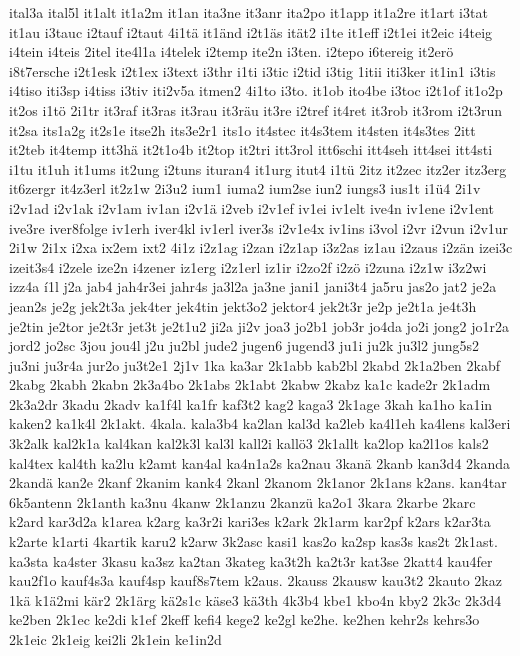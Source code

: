 {ital3a
ital5l
it1alt
it1a2m
it1an
ita3ne
it3anr
ita2po
it1app
it1a2re
it1art
i3tat
it1au
i3tauc
i2tauf
i2taut
4i1tä
it1änd
i2t1äs
ität2
i1te
it1eff
i2t1ei
it2eic
i4teig
i4tein
i4teis
2itel
ite4l1a
i4telek
i2temp
ite2n
i3ten.
i2tepo
i6tereig
it2erö
i8t7ersche
i2t1esk
i2t1ex
i3text
i3thr
i1ti
i3tic
i2tid
i3tig
1itii
iti3ker
it1in1
i3tis
i4tiso
iti3sp
i4tiss
i3tiv
iti2v5a
itmen2
4i1to
i3to.
it1ob
ito4be
i3toc
i2t1of
it1o2p
it2os
i1tö
2i1tr
it3raf
it3ras
it3rau
it3räu
it3re
i2tref
it4ret
it3rob
it3rom
i2t3run
it2sa
its1a2g
it2s1e
itse2h
its3e2r1
its1o
it4stec
it4s3tem
it4sten
it4s3tes
2itt
it2teb
it4temp
itt3hä
it2t1o4b
it2top
it2tri
itt3rol
itt6schi
itt4seh
itt4sei
itt4sti
i1tu
it1uh
it1ums
it2ung
i2tuns
ituran4
it1urg
itut4
i1tü
2itz
it2zec
itz2er
itz3erg
it6zergr
it4z3erl
it2z1w
2i3u2
ium1
iuma2
ium2se
iun2
iungs3
ius1t
i1ü4
2i1v
i2v1ad
i2v1ak
i2v1am
iv1an
i2v1ä
i2veb
i2v1ef
iv1ei
iv1elt
ive4n
iv1ene
i2v1ent
ive3re
iver8folge
iv1erh
iver4kl
iv1erl
iver3s
i2v1e4x
iv1ins
i3vol
i2vr
i2vun
i2v1ur
2i1w
2i1x
i2xa
ix2em
ixt2
4i1z
i2z1ag
i2zan
i2z1ap
i3z2as
iz1au
i2zaus
i2zän
izei3c
izeit3s4
i2zele
ize2n
i4zener
iz1erg
i2z1erl
iz1ir
i2zo2f
i2zö
i2zuna
i2z1w
i3z2wi
izz4a
í1l
j2a
jab4
jah4r3ei
jahr4s
ja3l2a
ja3ne
jani1
jani3t4
ja5ru
jas2o
jat2
je2a
jean2s
je2g
jek2t3a
jek4ter
jek4tin
jekt3o2
jektor4
jek2t3r
je2p
je2t1a
je4t3h
je2tin
je2tor
je2t3r
jet3t
je2t1u2
ji2a
ji2v
joa3
jo2b1
job3r
jo4da
jo2i
jong2
jo1r2a
jord2
jo2sc
3jou
jou4l
j2u
ju2bl
jude2
jugen6
jugend3
ju1i
ju2k
ju3l2
jung5s2
ju3ni
ju3r4a
jur2o
ju3t2e1
2j1v
1ka
ka3ar
2k1abb
kab2bl
2kabd
2k1a2ben
2kabf
2kabg
2kabh
2kabn
2k3a4bo
2k1abs
2k1abt
2kabw
2kabz
ka1c
kade2r
2k1adm
2k3a2dr
3kadu
2kadv
ka1f4l
ka1fr
kaf3t2
kag2
kaga3
2k1age
3kah
ka1ho
ka1in
kaken2
ka1k4l
2k1akt.
4kala.
kala3b4
ka2lan
kal3d
ka2leb
ka4l1eh
ka4lens
kal3eri
3k2alk
kal2k1a
kal4kan
kal2k3l
kal3l
kall2i
kallö3
2k1allt
ka2lop
ka2l1os
kals2
kal4tex
kal4th
ka2lu
k2amt
kan4al
ka4n1a2s
ka2nau
3kanä
2kanb
kan3d4
2kanda
2kandä
kan2e
2kanf
2kanim
kank4
2kanl
2kanom
2k1anor
2k1ans
k2ans.
kan4tar
6k5antenn
2k1anth
ka3nu
4kanw
2k1anzu
2kanzü
ka2o1
3kara
2karbe
2karc
k2ard
kar3d2a
k1area
k2arg
ka3r2i
kari3es
k2ark
2k1arm
kar2pf
k2ars
k2ar3ta
k2arte
k1arti
4kartik
karu2
k2arw
3k2asc
kasi1
kas2o
ka2sp
kas3s
kas2t
2k1ast.
ka3sta
ka4ster
3kasu
ka3sz
ka2tan
3kateg
ka3t2h
ka2t3r
kat3se
2katt4
kau4fer
kau2f1o
kauf4s3a
kauf4sp
kauf8s7tem
k2aus.
2kauss
2kausw
kau3t2
2kauto
2kaz
1kä
k1ä2mi
kär2
2k1ärg
kä2s1c
käse3
kä3th
4k3b4
kbe1
kbo4n
kby2
2k3c
2k3d4
ke2ben
2k1ec
ke2di
k1ef
2keff
kefi4
kege2
ke2gl
ke2he.
ke2hen
kehr2s
kehrs3o
2k1eic
2k1eig
kei2li
2k1ein
ke1in2d
}
